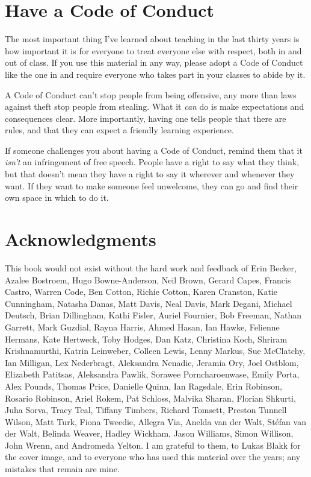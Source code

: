 \section{Have a Code of Conduct}\label{s:intro-code-of-conduct}

The most important thing I've learned about teaching in the last
thirty years is how important it is for everyone to treat everyone
else with respect, both in and out of class.  If you use this material
in any way, please adopt a Code of Conduct like the one in
 and require everyone who takes part in your classes
to abide by it.

A Code of Conduct can't stop people from being offensive, any more
than laws against theft stop people from stealing.  What it \emph{can}
do is make expectations and consequences clear.  More importantly,
having one tells people that there are rules, and that they can expect
a friendly learning experience.

If someone challenges you about having a Code of Conduct, remind them
that it \emph{isn't} an infringement of free speech.  People have a
right to say what they think, but that doesn't mean they have a right
to say it wherever and whenever they want.  If they want to make
someone feel unwelcome, they can go and find their own space in which
to do it.

\section{Acknowledgments}\label{s:intro-acknowledgments}

This book would not exist without the hard work and feedback of Erin
Becker, Azalee Bostroem, Hugo Bowne-Anderson, Neil Brown, Gerard
Capes, Francis Castro, Warren Code, Ben Cotton, Richie Cotton, Karen
Cranston, Katie Cunningham, Natasha Danas, Matt Davis, Neal Davis,
Mark Degani, Michael Deutsch, Brian Dillingham, Kathi Fisler, Auriel
Fournier, Bob Freeman, Nathan Garrett, Mark Guzdial, Rayna Harris,
Ahmed Hasan, Ian Hawke, Felienne Hermans, Kate Hertweck, Toby Hodges,
Dan Katz, Christina Koch, Shriram Krishnamurthi, Katrin Leinweber,
Colleen Lewis, Lenny Markus, Sue McClatchy, Ian Milligan, Lex
Nederbragt, Aleksandra Nenadic, Jeramia Ory, Joel Ostblom, Elizabeth
Patitsas, Aleksandra Pawlik, Sorawee Porncharoenwase, Emily Porta,
Alex Pounds, Thomas Price, Danielle Quinn, Ian Ragsdale, Erin
Robinson, Rosario Robinson, Ariel Rokem, Pat Schloss, Malvika Sharan,
Florian Shkurti, Juha Sorva, Tracy Teal, Tiffany Timbers, Richard
Tomsett, Preston Tunnell Wilson, Matt Turk, Fiona Tweedie, Allegra
Via, Anelda van der Walt, St\'{e}fan van der Walt, Belinda Weaver,
Hadley Wickham, Jason Williams, Simon Willison, John Wrenn, and
Andromeda Yelton.  I am grateful to them, to Lukas Blakk for the cover
image, and to everyone who has used this material over the years; any
mistakes that remain are mine.

